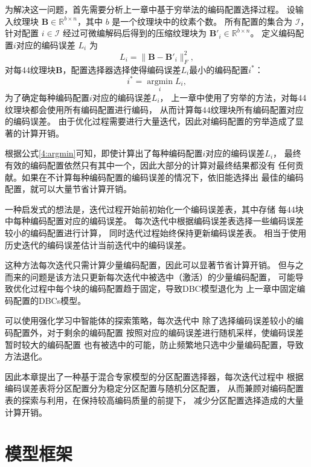 为解决这一问题，首先需要分析上一章中基于穷举法的编码配置选择过程。
设输入纹理块 $\mathbf{B}\in\mathbb{R}^{b\times n}$，其中 $b$ 是一个纹理块中的纹素个数。
所有配置的集合为 $\mathcal{I}$，针对配置 $i\in\mathcal{I}$ 经过可微编解码后得到的压缩纹理块为 $\mathbf{B}'_i\in\mathbb{R}^{b\times n}$。
定义编码配置$i$对应的编码误差 $L_i$ 为
\begin{equation}
L_i=\|\mathbf{B}-\mathbf{B}'_i\|_F^2,
\end{equation}
对每4\times4纹理块$\mathbf{B}$，配置选择器选择使得编码误差$L_i$最小的编码配置$i^*$：
\begin{equation}
    \label{4:argmin}
    i^*=\mathop{\arg\min}\limits_{i} L_i,
\end{equation}
为了确定每种编码配置$i$对应的编码误差$L_i$，
上一章中使用了穷举的方法，对每4\times4纹理块都会使用所有编码配置进行编码，
从而计算每4\times4纹理块所有编码配置对应的编码误差。
由于优化过程需要进行大量迭代，因此对编码配置的穷举造成了显著的计算开销。

根据公式\ref{4:argmin}可知，即使计算出了每种编码配置$i$对应的编码误差$L_i$，
最终有效的编码配置依然只有其中一个，因此大部分的计算对最终结果都没有
任何贡献。如果在不计算每种编码配置的编码误差的情况下，依旧能选择出
最佳的编码配置，就可以大量节省计算开销。

一种启发式的想法是，迭代过程开始前初始化一个编码误差表，其中存储
每4\times4块中每种编码配置对应的编码误差。
每次迭代中根据编码误差表选择一些编码误差较小的编码配置进行计算，
同时迭代过程始终保持更新编码误差表。
相当于使用历史迭代的编码误差估计当前迭代中的编码误差。

这种方法每次迭代只需计算少量编码配置，因此可以显著节省计算开销。
但与之而来的问题是该方法只更新每次迭代中被选中（激活）的少量编码配置，
可能导致优化过程中每个块的编码配置趋于固定，导致DBC模型退化为
上一章中固定编码配置的DBCs模型。

可以使用强化学习中智能体的探索策略，每次迭代中
除了选择编码误差较小的编码配置外，对于剩余的编码配置
按照对应的编码误差进行随机采样，使编码误差暂时较大的编码配置
也有被选中的可能，防止频繁地只选中少量编码配置，导致方法退化。

因此本章提出了一种基于混合专家模型的分区配置选择器，每次迭代过程中
根据编码误差表将分区配置分为稳定分区配置与随机分区配置，
从而兼顾对编码配置表的探索与利用，在保持较高编码质量的前提下，
减少分区配置选择造成的大量计算开销。

\section{模型框架}

